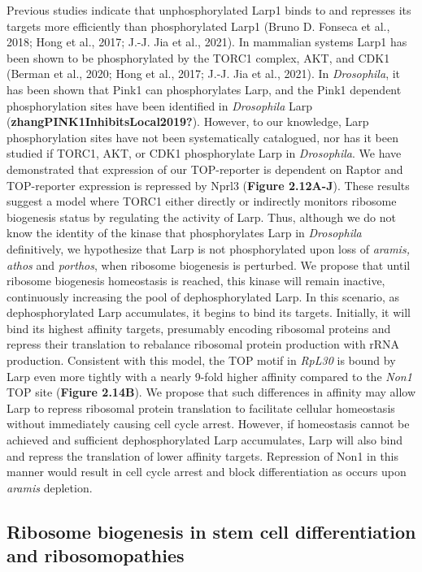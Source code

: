 \documentclass[12pt,oneside]{reedthesis}
\begin{document}
Previous studies indicate that unphosphorylated Larp1 binds to and represses its targets more efficiently than phosphorylated Larp1 (Bruno D. Fonseca et al., 2018; Hong et al., 2017; J.-J. Jia et al., 2021). In mammalian systems Larp1 has been shown to be phosphorylated by the TORC1 complex, AKT, and CDK1 (Berman et al., 2020; Hong et al., 2017; J.-J. Jia et al., 2021). In \emph{Drosophila}, it has been shown that Pink1 can phosphorylates Larp, and the Pink1 dependent phosphorylation sites have been identified in \emph{Drosophila} Larp (\textbf{zhangPINK1InhibitsLocal2019?}). However, to our knowledge, Larp phosphorylation sites have not been systematically catalogued, nor has it been studied if TORC1, AKT, or CDK1 phosphorylate Larp in \emph{Drosophila}. We have demonstrated that expression of our TOP-reporter is dependent on Raptor and TOP-reporter expression is repressed by Nprl3 (\textbf{Figure 2.12A-J}). These results suggest a model where TORC1 either directly or indirectly monitors ribosome biogenesis status by regulating the activity of Larp. Thus, although we do not know the identity of the kinase that phosphorylates Larp in \emph{Drosophila} definitively, we hypothesize that Larp is not phosphorylated upon loss of \emph{aramis, athos} and \emph{porthos}, when ribosome biogenesis is perturbed. We propose that until ribosome biogenesis homeostasis is reached, this kinase will remain inactive, continuously increasing the pool of dephosphorylated Larp. In this scenario, as dephosphorylated Larp accumulates, it begins to bind its targets. Initially, it will bind its highest affinity targets, presumably encoding ribosomal proteins and repress their translation to rebalance ribosomal protein production with rRNA production. Consistent with this model, the TOP motif in \emph{RpL30} is bound by Larp even more tightly with a nearly 9-fold higher affinity compared to the \emph{Non1} TOP site (\textbf{Figure 2.14B}). We propose that such differences in affinity may allow Larp to repress ribosomal protein translation to facilitate cellular homeostasis without immediately causing cell cycle arrest. However, if homeostasis cannot be achieved and sufficient dephosphorylated Larp accumulates, Larp will also bind and repress the translation of lower affinity targets. Repression of Non1 in this manner would result in cell cycle arrest and block differentiation as occurs upon \emph{aramis} depletion.

\hypertarget{ribosome-biogenesis-in-stem-cell-differentiation-and-ribosomopathies}{%
\subsection{Ribosome biogenesis in stem cell differentiation and ribosomopathies}\label{ribosome-biogenesis-in-stem-cell-differentiation-and-ribosomopathies}}
\end{document}

